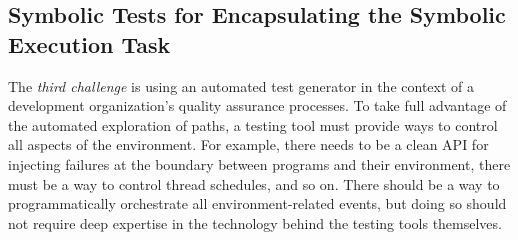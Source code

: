 \subsection{Symbolic Tests for Encapsulating the Symbolic Execution Task}

The {\em third challenge} is using an automated test generator in the context of a development organization's quality assurance processes.  To take full advantage of the automated exploration of paths, a testing tool must provide ways to control all aspects of the environment.  For example, there needs to be a clean API for injecting failures at the boundary between programs and their environment, there must be a way to control thread schedules, and so on.  There should be a way to programmatically orchestrate all environment-related events, but doing so should not require deep expertise in the technology behind the testing tools themselves.

\fi

